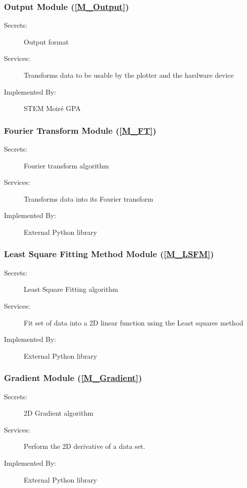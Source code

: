 \documentclass[12pt, titlepage]{article}
\newcommand{\progname}{STEM Moir{\'e} GPA}
\begin{document}
\subsubsection{Output Module (\cref{M_Output})}

\begin{description}
\item[Secrets:]Output format 
\item[Services:]Transforms data to be usable by the plotter and the hardware device
\item[Implemented By:] \progname{}
\end{description}

\subsubsection{Fourier Transform Module (\cref{M_FT})}

\begin{description}
\item[Secrets:] Fourier transform algorithm
\item[Services:] Transforms data into its Fourier transform
\item[Implemented By:] External Python library
\end{description}

\subsubsection{Least Square Fitting Method Module (\cref{M_LSFM})}

\begin{description}
\item[Secrets:] Least Square Fitting algorithm
\item[Services:] Fit set of data into a 2D linear function using the Least squares method
\item[Implemented By:] External Python library
\end{description}

\subsubsection{Gradient Module (\cref{M_Gradient})}

\begin{description}
\item[Secrets:] 2D Gradient algorithm
\item[Services:] Perform the 2D derivative of a data set.
\item[Implemented By:] External Python library
\end{description}
\end{document}
